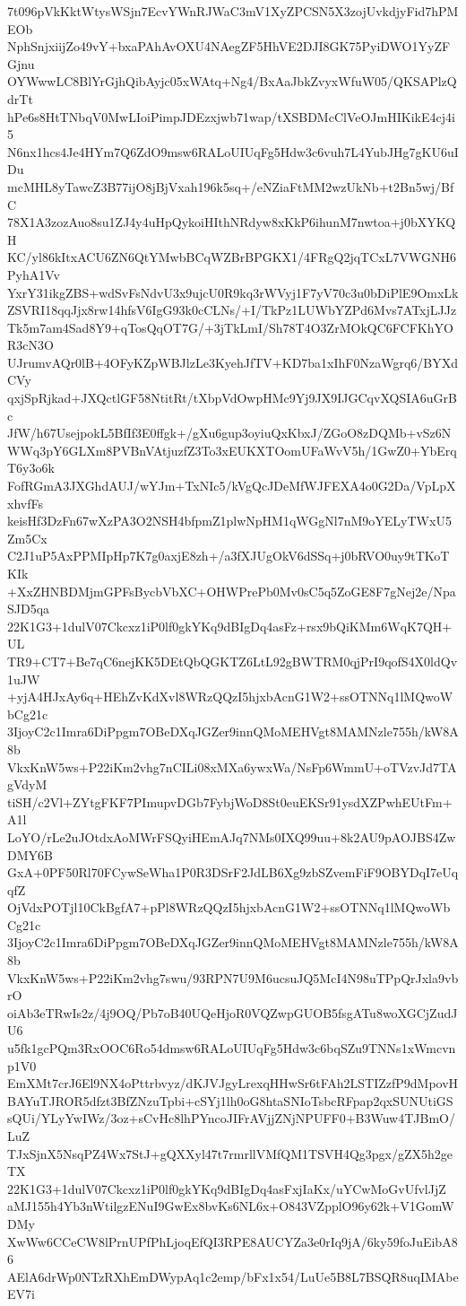 7t096pVkKktWtysWSjn7EcvYWnRJWaC3mV1XyZPCSN5X3zojUvkdjyFid7hPMEOb
NphSnjxiijZo49vY+bxaPAhAvOXU4NAegZF5HhVE2DJI8GK75PyiDWO1YyZFGjnu
OYWwwLC8BlYrGjhQibAyjc05xWAtq+Ng4/BxAaJbkZvyxWfuW05/QKSAPlzQdrTt
hPe6s8HtTNbqV0MwLIoiPimpJDEzxjwb71wap/tXSBDMcClVeOJmHIKikE4cj4i5
N6nx1hcs4Je4HYm7Q6ZdO9msw6RALoUIUqFg5Hdw3c6vuh7L4YubJHg7gKU6uIDu
mcMHL8yTawcZ3B77ijO8jBjVxah196k5sq+/eNZiaFtMM2wzUkNb+t2Bn5wj/BfC
78X1A3zozAuo8su1ZJ4y4uHpQykoiHIthNRdyw8xKkP6ihunM7nwtoa+j0bXYKQH
KC/yl86kItxACU6ZN6QtYMwbBCqWZBrBPGKX1/4FRgQ2jqTCxL7VWGNH6PyhA1Vv
YxrY31ikgZBS+wdSvFsNdvU3x9ujcU0R9kq3rWVyj1F7yV70c3u0bDiPlE9OmxLk
ZSVRI18qqJjx8rw14hfsV6IgG93k0cCLNs/+I/TkPz1LUWbYZPd6Mvs7ATxjLJJz
Tk5m7am4Sad8Y9+qTosQqOT7G/+3jTkLmI/Sh78T4O3ZrMOkQC6FCFKhYOR3cN3O
UJrumvAQr0lB+4OFyKZpWBJlzLe3KyehJfTV+KD7ba1xIhF0NzaWgrq6/BYXdCVy
qxjSpRjkad+JXQctlGF58NtitRt/tXbpVdOwpHMc9Yj9JX9IJGCqvXQSIA6uGrBc
JfW/h67UsejpokL5BfIf3E0ffgk+/gXu6gup3oyiuQxKbxJ/ZGoO8zDQMb+vSz6N
WWq3pY6GLXm8PVBnVAtjuzfZ3To3xEUKXTOomUFaWvV5h/1GwZ0+YbErqT6y3o6k
FofRGmA3JXGhdAUJ/wYJm+TxNIc5/kVgQcJDeMfWJFEXA4o0G2Da/VpLpXxhvfFs
keisHf3DzFn67wXzPA3O2NSH4bfpmZ1plwNpHM1qWGgNl7nM9oYELyTWxU5Zm5Cx
C2J1uP5AxPPMIpHp7K7g0axjE8zh+/a3fXJUgOkV6dSSq+j0bRVO0uy9tTKoTKIk
+XxZHNBDMjmGPFsBycbVbXC+OHWPrePb0Mv0sC5q5ZoGE8F7gNej2e/NpaSJD5qa
22K1G3+1dulV07Ckcxz1iP0lf0gkYKq9dBIgDq4asFz+rsx9bQiKMm6WqK7QH+UL
TR9+CT7+Be7qC6nejKK5DEtQbQGKTZ6LtL92gBWTRM0qjPrI9qofS4X0ldQv1uJW
+yjA4HJxAy6q+HEhZvKdXvl8WRzQQzI5hjxbAcnG1W2+ssOTNNq1lMQwoWbCg21c
3IjoyC2c1Imra6DiPpgm7OBeDXqJGZer9innQMoMEHVgt8MAMNzle755h/kW8A8b
VkxKnW5ws+P22iKm2vhg7nCILi08xMXa6ywxWa/NsFp6WmmU+oTVzvJd7TAgVdyM
tiSH/c2Vl+ZYtgFKF7PImupvDGb7FybjWoD8St0euEKSr91ysdXZPwhEUtFm+A1l
LoYO/rLe2uJOtdxAoMWrFSQyiHEmAJq7NMs0IXQ99uu+8k2AU9pAOJBS4ZwDMY6B
GxA+0PF50Rl70FCywSeWha1P0R3DSrF2JdLB6Xg9zbSZvemFiF9OBYDqI7eUqqfZ
OjVdxPOTjl10CkBgfA7+pPl8WRzQQzI5hjxbAcnG1W2+ssOTNNq1lMQwoWbCg21c
3IjoyC2c1Imra6DiPpgm7OBeDXqJGZer9innQMoMEHVgt8MAMNzle755h/kW8A8b
VkxKnW5ws+P22iKm2vhg7swu/93RPN7U9M6ucsuJQ5McI4N98uTPpQrJxla9vbrO
oiAb3eTRwIs2z/4j9OQ/Pb7oB40UQeHjoR0VQZwpGUOB5fsgATu8woXGCjZudJU6
u5fk1gcPQm3RxOOC6Ro54dmsw6RALoUIUqFg5Hdw3c6bqSZu9TNNs1xWmcvnp1V0
EmXMt7crJ6El9NX4oPttrbvyz/dKJVJgyLrexqHHwSr6tFAh2LSTIZzfP9dMpovH
BAYuTJROR5dfzt3BfZNzuTpbi+cSYj1lh0oG8htaSNIoTsbcRFpap2qxSUNUtiGS
sQUi/YLyYwIWz/3oz+sCvHc8lhPYncoJIFrAVjjZNjNPUFF0+B3Wuw4TJBmO/LuZ
TJxSjnX5NsqPZ4Wx7StJ+gQXXyl47t7rmrllVMfQM1TSVH4Qg3pgx/gZX5h2geTX
22K1G3+1dulV07Ckcxz1iP0lf0gkYKq9dBIgDq4asFxjIaKx/uYCwMoGvUfvlJjZ
aMJ155h4Yb3nWtilgzENuI9GwEx8bvKs6NL6x+O843VZpplO96y62k+V1GomWDMy
XwWw6CCeCW8lPrnUPfPhLjoqEfQI3RPE8AUCYZa3e0rIq9jA/6ky59foJuEibA86
AElA6drWp0NTzRXhEmDWypAq1c2emp/bFx1x54/LuUe5B8L7BSQR8uqIMAbeEV7i
